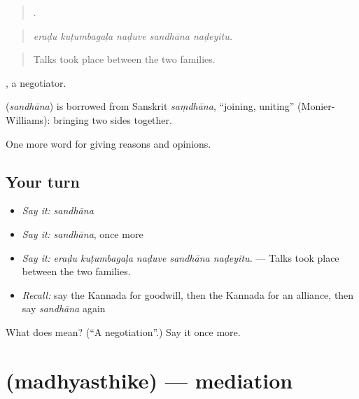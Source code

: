 \begin{quote}
    .
\end{quote}

\begin{quote}
\emph{eraḍu kuṭumbagaḷa naḍuve sandhāna naḍeyitu.}
\end{quote}

\begin{quote}
Talks took place between the two families.
\end{quote}

, a negotiator.

\begin{cousinweb}
\textbf{} (\emph{sandhāna}) is borrowed from Sanskrit \emph{saṃdhāna}, \textquotedblleft{}joining, uniting\textquotedblright{} (Monier-Williams): bringing two sides together.
\end{cousinweb}

\begin{grammarlens}[title={What you've built}]
One more word for giving reasons and opinions.
\end{grammarlens}

\subsection*{Your turn}
\begin{itemize}
\raggedright
  \item \emph{Say it:} \emph{sandhāna}
  \item \emph{Say it:} \emph{sandhāna}, once more
  \item \emph{Say it:} \emph{eraḍu kuṭumbagaḷa naḍuve sandhāna naḍeyitu.} — Talks took place between the two families.
  \item \emph{Recall:} say the Kannada for goodwill, then the Kannada for an alliance, then say \emph{sandhāna} again
\end{itemize}

\begin{tcolorbox}[breakable,colback=teal!4,colframe=teal!35!black,title={Before you move on}]
What does  mean? (\textquotedblleft{}A negotiation\textquotedblright{}.) Say it once more.
\end{tcolorbox}
\section[\texorpdfstring{\kn{ಮಧ್ಯಸ್ಥಿಕೆ} (madhyasthike)}{ಮಧ್ಯಸ್ಥಿಕೆ (madhyasthike)}]{ (madhyasthike) — mediation}

